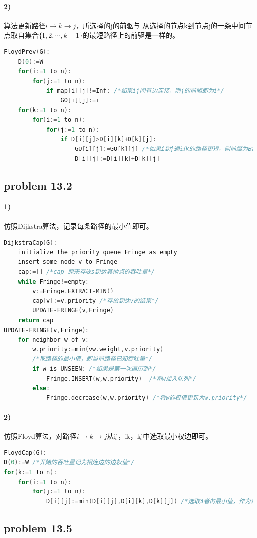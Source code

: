 \documentclass[11pt,a4paper,oneside,oldfontcommands]{ctexart}
\begin{document}
\paragraph*{2)}
算法更新路径$i \rightarrow k \rightarrow j$，所选择的j的前驱与
从选择的节点k到节点j的一条中间节点取自集合$\{1,2,\cdots,k-1\}$的最短路径上的前驱是一样的。

\begin{lstlisting}[language=C++,title=FloydPrev.func]
FloydPrev(G):
	D(0):=W
	for(i:=1 to n):
		for(j:=1 to n):
			if map[i][j]!=Inf: /*如果ij间有边连接，则j的前驱即为i*/
				GO[i][j]:=i
	for(k:=1 to n):
		for(i:=1 to n):
			for(j:=1 to n):
				if D[i][j]>D[i][k]+D[k][j]:
					GO[i][j]:=GO[k][j] /*如果i到j通过k的路径更短，则前缀为Back[k][j]*/
					D[i][j]:=D[i][k]+D[k][j]
\end{lstlisting}
{\subsection*{problem 13.2}}
\paragraph*{1)}仿照Dijkstra算法，记录每条路径的最小值即可。
\begin{lstlisting}[language=C++,title=DijkstraCap.func]
DijkstraCap(G):
	initialize the priority queue Fringe as empty
	insert some node v to Fringe
	cap:=[] /*cap 原来存放s到达其他点的吞吐量*/
	while Fringe!=empty:
		v:=Fringe.EXTRACT-MIN()
		cap[v]:=v.priority /*存放到达v的结果*/
		UPDATE-FRINGE(v,Fringe)
	return cap
UPDATE-FRINGE(v,Fringe):
	for neighbor w of v:
		w.priority:=min(vw.weight,v.priority) 
		/*取路径的最小值，即当前路径已知吞吐量*/
		if w is UNSEEN: /*如果是第一次遍历到*/
			Fringe.INSERT(w,w.priority)  /*将w加入队列*/
		else:
			Fringe.decrease(w,w.priority) /*将w的权值更新为w.priority*/
\end{lstlisting}
\paragraph*{2)}仿照Floyd算法，对路径$i \rightarrow k \rightarrow j$从ij，ik，kj中选取最小权边即可。
\begin{lstlisting}[language=C++,title=FloydCap.func]
FloydCap(G):
D(0):=W /*开始的吞吐量记为相连边的边权值*/
for(k:=1 to n):
	for(i:=1 to n):
		for(j:=1 to n):
			D[i][j]:=min(D[i][j],D[i][k],D[k][j]) /*选取3者的最小值，作为最大吞吐量*/
\end{lstlisting}
\newpage
{\subsection*{problem 13.5}}
\end{document}
